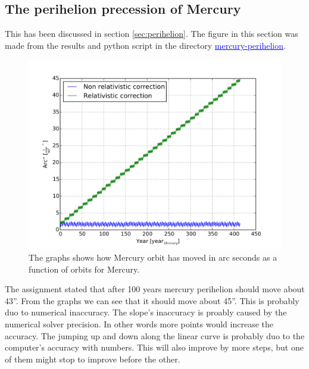 \subsection{The perihelion precession of Mercury}

This has been discussed in section \ref{sec:perihelion}. The figure in this section was made from the results and python script in the directory \href{https://github.com/erikfsk/Project-3/tree/master/Project3/mercury-perihelion}{\textcolor{blue}{mercury-perihelion}}.


\begin{figure}[H]
    \centering
    \includegraphics[width=0.8\linewidth]{result/bilder/perihelion.png}
    \caption{The graphs shows how Mercury orbit has moved in arc seconds as a function of orbits for Mercury.}
    \label{fig:perihelion}
\end{figure}

 The assignment stated that after 100 years mercury perihelion should move about 43''. From the graphs we can see that it should move about 45''. This is probably duo to numerical inaccuracy. The slope's inaccuracy is proably caused by the numerical solver precision. In other words more points would increase the accuracy. The jumping up and down along the linear curve is probably duo to the computer's accuracy with numbers. This will also improve by more steps, but one of them might stop to improve before the other.





